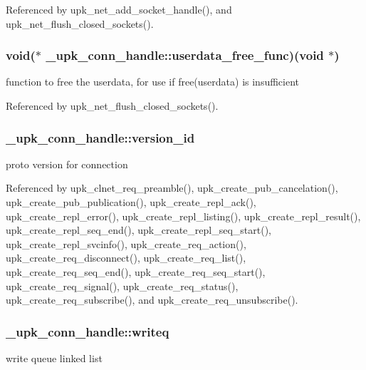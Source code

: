 Referenced by upk\_\-net\_\-add\_\-socket\_\-handle(), and upk\_\-net\_\-flush\_\-closed\_\-sockets().

\subsubsection[{userdata\_\-free\_\-func}]{\setlength{\rightskip}{0pt plus 5cm}void($\ast$ {\bf \_\-upk\_\-conn\_\-handle::userdata\_\-free\_\-func})(void $\ast$)}\label{struct__upk__conn__handle_ab195a33c7610fa67378db34b731bc185}
function to free the userdata, for use if free(userdata) is insufficient 

Referenced by upk\_\-net\_\-flush\_\-closed\_\-sockets().

\subsubsection[{version\_\-id}]{ {\bf \_\-upk\_\-conn\_\-handle::version\_\-id}}\label{struct__upk__conn__handle_a8a1da5597243e08b9240cc84379d08d5}
proto version for connection 

Referenced by upk\_\-clnet\_\-req\_\-preamble(), upk\_\-create\_\-pub\_\-cancelation(), upk\_\-create\_\-pub\_\-publication(), upk\_\-create\_\-repl\_\-ack(), upk\_\-create\_\-repl\_\-error(), upk\_\-create\_\-repl\_\-listing(), upk\_\-create\_\-repl\_\-result(), upk\_\-create\_\-repl\_\-seq\_\-end(), upk\_\-create\_\-repl\_\-seq\_\-start(), upk\_\-create\_\-repl\_\-svcinfo(), upk\_\-create\_\-req\_\-action(), upk\_\-create\_\-req\_\-disconnect(), upk\_\-create\_\-req\_\-list(), upk\_\-create\_\-req\_\-seq\_\-end(), upk\_\-create\_\-req\_\-seq\_\-start(), upk\_\-create\_\-req\_\-signal(), upk\_\-create\_\-req\_\-status(), upk\_\-create\_\-req\_\-subscribe(), and upk\_\-create\_\-req\_\-unsubscribe().

\subsubsection[{writeq}]{ {\bf \_\-upk\_\-conn\_\-handle::writeq}}\label{struct__upk__conn__handle_a68692e4f2f84769ddbaa5165f83114a7}
write queue linked list 

